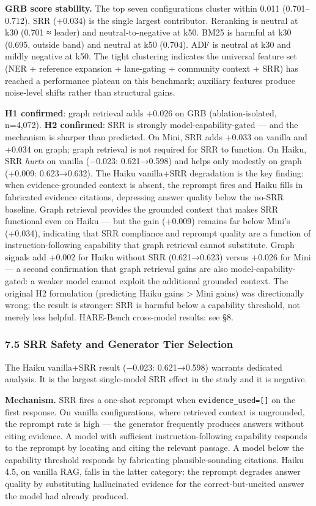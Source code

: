 \documentclass[
]{article}
\begin{document}
\textbf{GRB score stability.} The top seven configurations cluster
within 0.011 (0.701--0.712). SRR (+0.034) is the single largest
contributor. Reranking is neutral at k30 (0.701 ≈ leader) and
neutral-to-negative at k50. BM25 is harmful at k30 (0.695, outside band)
and neutral at k50 (0.704). ADF is neutral at k30 and mildly negative at
k50. The tight clustering indicates the universal feature set (NER +
reference expansion + lane-gating + community context + SRR) has reached
a performance plateau on this benchmark; auxiliary features produce
noise-level shifts rather than structural gains.

\textbf{H1 confirmed}: graph retrieval adds +0.026 on GRB
(ablation-isolated, n=4,072). \textbf{H2 confirmed}: SRR is strongly
model-capability-gated --- and the mechanism is sharper than predicted.
On Mini, SRR adds +0.033 on vanilla and +0.034 on graph; graph retrieval
is not required for SRR to function. On Haiku, SRR \emph{hurts} on
vanilla (−0.023: 0.621→0.598) and helps only modestly on graph (+0.009:
0.623→0.632). The Haiku vanilla+SRR degradation is the key finding: when
evidence-grounded context is absent, the reprompt fires and Haiku fills
in fabricated evidence citations, depressing answer quality below the
no-SRR baseline. Graph retrieval provides the grounded context that
makes SRR functional even on Haiku --- but the gain (+0.009) remains far
below Mini's (+0.034), indicating that SRR compliance and reprompt
quality are a function of instruction-following capability that graph
retrieval cannot substitute. Graph signals add +0.002 for Haiku without
SRR (0.621→0.623) versus +0.026 for Mini --- a second confirmation that
graph retrieval gains are also model-capability-gated: a weaker model
cannot exploit the additional grounded context. The original H2
formulation (predicting Haiku gains \textgreater{} Mini gains) was
directionally wrong; the result is stronger: SRR is harmful below a
capability threshold, not merely less helpful. HARE-Bench cross-model
results: see §8.

\subsubsection{7.5 SRR Safety and Generator Tier
Selection}\label{srr-safety-and-generator-tier-selection}

The Haiku vanilla+SRR result (−0.023: 0.621→0.598) warrants dedicated
analysis. It is the largest single-model SRR effect in the study and it
is negative.

\textbf{Mechanism.} SRR fires a one-shot reprompt when
\texttt{evidence\_used={[}{]}} on the first response. On vanilla
configurations, where retrieved context is ungrounded, the reprompt rate
is high --- the generator frequently produces answers without citing
evidence. A model with sufficient instruction-following capability
responds to the reprompt by locating and citing the relevant passage. A
model below the capability threshold responds by fabricating
plausible-sounding citations. Haiku 4.5, on vanilla RAG, falls in the
latter category: the reprompt degrades answer quality by substituting
hallucinated evidence for the correct-but-uncited answer the model had
already produced.
\end{document}
